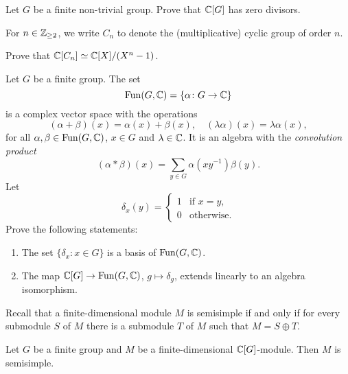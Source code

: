 \begin{exercise}
    Let $G$ be a finite non-trivial group. Prove that
    $\mathbb{C}[G]$ has zero divisors. 
\end{exercise}

For $n\in\mathbb{Z}_{\geq2}$, we write $C_n$ to denote the (multiplicative) cyclic group of order $n$. 

\begin{exercise}
Prove that $\mathbb{C}[C_n]\simeq \mathbb{C}[X]/(X^n-1)$. 
\end{exercise}

\begin{exercise}
    Let $G$ be a finite group. The set
    \[
    \operatorname{Fun}(G,\mathbb{C})=\{\alpha\colon G\to\mathbb{C}\}
    \]
    is a complex vector space with 
    the operations 
    \[
    (\alpha+\beta)(x)=\alpha(x)+\beta(x),
    \quad
    (\lambda\alpha)(x)=\lambda\alpha(x),
    \]
    for all $\alpha,\beta\in\operatorname{Fun}(G,\mathbb{C})$, $x\in G$ 
    and $\lambda\in\mathbb{C}$. It is an algebra
    with the \emph{convolution product} 
    \[
    (\alpha*\beta)(x)=\sum_{y\in G}\alpha(xy^{-1})\beta(y).
    \]
    Let 
    \[
    \delta_x(y)=\begin{cases}
            1 & \text{if $x=y$},\\
            0 & \text{otherwise}.
        \end{cases}
    \]
    Prove the following statements:
    \begin{enumerate}
        \item 
        The set $\{\delta_x:x\in G\}$ is a basis
        of $\operatorname{Fun}(G,\mathbb{C})$. 
        \item The map $\mathbb{C}[G]\to\operatorname{Fun}(G,\mathbb{C})$, $g\mapsto\delta_g$, 
            extends linearly to an algebra isomorphism. 
    \end{enumerate}
\end{exercise}


Recall that a finite-dimensional module $M$ is semisimple 
if and only if for every submodule $S$ of $M$ there 
is a submodule $T$ of $M$ such that $M=S\oplus T$.    

\begin{theorem}[Maschke]
    Let $G$ be a finite
    group and $M$ be a finite-dimensional $\mathbb{C}[G]$-module.
    Then $M$ is semisimple. 
\end{theorem}

